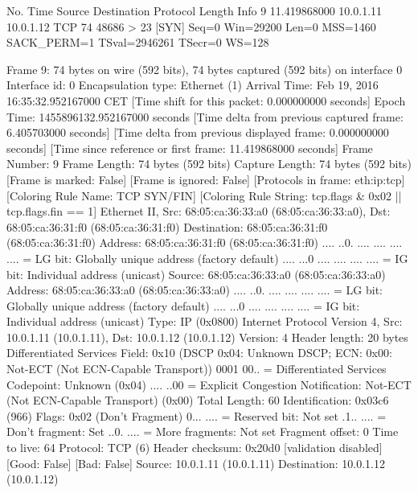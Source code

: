No.     Time           Source                Destination           Protocol Length Info
      9 11.419868000   10.0.1.11             10.0.1.12             TCP      74     48686 > 23 [SYN] Seq=0 Win=29200 Len=0 MSS=1460 SACK_PERM=1 TSval=2946261 TSecr=0 WS=128

Frame 9: 74 bytes on wire (592 bits), 74 bytes captured (592 bits) on interface 0
    Interface id: 0
    Encapsulation type: Ethernet (1)
    Arrival Time: Feb 19, 2016 16:35:32.952167000 CET
    [Time shift for this packet: 0.000000000 seconds]
    Epoch Time: 1455896132.952167000 seconds
    [Time delta from previous captured frame: 6.405703000 seconds]
    [Time delta from previous displayed frame: 0.000000000 seconds]
    [Time since reference or first frame: 11.419868000 seconds]
    Frame Number: 9
    Frame Length: 74 bytes (592 bits)
    Capture Length: 74 bytes (592 bits)
    [Frame is marked: False]
    [Frame is ignored: False]
    [Protocols in frame: eth:ip:tcp]
    [Coloring Rule Name: TCP SYN/FIN]
    [Coloring Rule String: tcp.flags & 0x02 || tcp.flags.fin == 1]
Ethernet II, Src: 68:05:ca:36:33:a0 (68:05:ca:36:33:a0), Dst: 68:05:ca:36:31:f0 (68:05:ca:36:31:f0)
    Destination: 68:05:ca:36:31:f0 (68:05:ca:36:31:f0)
        Address: 68:05:ca:36:31:f0 (68:05:ca:36:31:f0)
        .... ..0. .... .... .... .... = LG bit: Globally unique address (factory default)
        .... ...0 .... .... .... .... = IG bit: Individual address (unicast)
    Source: 68:05:ca:36:33:a0 (68:05:ca:36:33:a0)
        Address: 68:05:ca:36:33:a0 (68:05:ca:36:33:a0)
        .... ..0. .... .... .... .... = LG bit: Globally unique address (factory default)
        .... ...0 .... .... .... .... = IG bit: Individual address (unicast)
    Type: IP (0x0800)
Internet Protocol Version 4, Src: 10.0.1.11 (10.0.1.11), Dst: 10.0.1.12 (10.0.1.12)
    Version: 4
    Header length: 20 bytes
    Differentiated Services Field: 0x10 (DSCP 0x04: Unknown DSCP; ECN: 0x00: Not-ECT (Not ECN-Capable Transport))
        0001 00.. = Differentiated Services Codepoint: Unknown (0x04)
        .... ..00 = Explicit Congestion Notification: Not-ECT (Not ECN-Capable Transport) (0x00)
    Total Length: 60
    Identification: 0x03c6 (966)
    Flags: 0x02 (Don't Fragment)
        0... .... = Reserved bit: Not set
        .1.. .... = Don't fragment: Set
        ..0. .... = More fragments: Not set
    Fragment offset: 0
    Time to live: 64
    Protocol: TCP (6)
    Header checksum: 0x20d0 [validation disabled]
        [Good: False]
        [Bad: False]
    Source: 10.0.1.11 (10.0.1.11)
    Destination: 10.0.1.12 (10.0.1.12)
